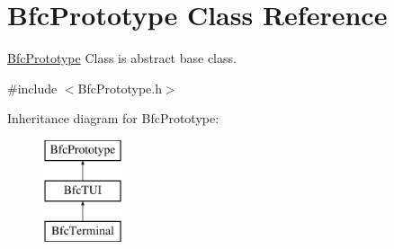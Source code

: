 \hypertarget{classBfcPrototype}{\section{Bfc\-Prototype Class Reference}
\label{classBfcPrototype}
}


\hyperlink{classBfcPrototype}{Bfc\-Prototype} Class is abstract base class.  




{\ttfamily \#include $<$Bfc\-Prototype.\-h$>$}

Inheritance diagram for Bfc\-Prototype\-:\begin{figure}[H]
\begin{center}
\leavevmode
\includegraphics[height=3.000000cm]{classBfcPrototype}
\end{center}
\end{figure}
